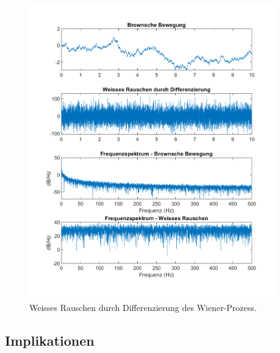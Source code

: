 
\begin{figure}
	\centering
	\includegraphics[width=0.95\textwidth]{papers/brown/images/weissesRauscheDurchBrown-timeDomain.png}
	\caption{Weisses Rauschen durch Differenzierung des Wiener-Prozess.}
	\label{brown:diffWienerFFT}
\end{figure}


\subsection{Implikationen\label{brown:Rauschen:Implikationen}}


